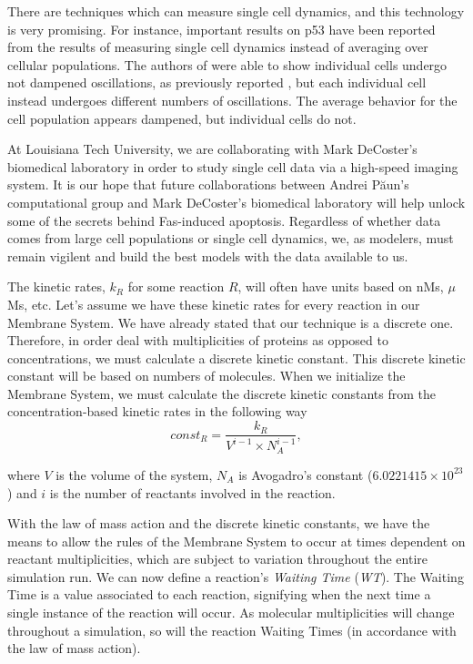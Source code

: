 \documentclass[copyright]{eptcs}
\newcommand{\noi}{\noindent}
\begin{document}
There are techniques which can measure single cell dynamics, and this technology is very promising.  For instance, important results on p53 have been reported~\cite{lahav04} from the results of measuring single cell dynamics instead of averaging over cellular populations.  The authors of \cite{lahav04} were able to show individual cells undergo not dampened oscillations, as previously reported \cite{baror00}, but each individual cell instead undergoes different numbers of oscillations.  The average behavior for the cell population appears dampened, but individual cells do not.

At Louisiana Tech University, we are collaborating with Mark DeCoster's biomedical laboratory in order to study single cell data via a high-speed imaging system.  It is our hope that future collaborations between Andrei P\u aun's computational group and Mark DeCoster's biomedical laboratory will help unlock some of the secrets behind Fas-induced apoptosis.  Regardless of whether data comes from large cell populations or single cell dynamics, we, as modelers, must remain vigilent and build the best models with the data available to us.

The kinetic rates, $k_R$ for some reaction $R$, will often have units based on nMs, $\mu $Ms, etc.  Let's assume we have these kinetic rates for every reaction in our Membrane System.  We have already stated that our technique is a discrete one.  Therefore, in order deal with multiplicities of proteins as opposed to concentrations, we must calculate a discrete kinetic constant.  This discrete kinetic constant will be based on numbers of molecules.  When we initialize the Membrane System, we must calculate the discrete kinetic constants from the concentration-based kinetic rates in the following way
\begin{equation}
\mathit{const}_R = \frac{k_R}{V^{i-1}\times N_A^{i-1}},
\label{constr}
\end{equation}

\noi where $V$ is the volume of the system, $N_A$ is Avogadro's constant ($6.0221415\times 10^{23}$) and $i$ is the number of reactants involved in the reaction.

With the law of mass action and the discrete kinetic constants, we have the means to allow the rules of the Membrane System to occur at times dependent on reactant multiplicities, which are subject to variation throughout the entire simulation run.  We can now define a reaction's \emph{Waiting Time} (\emph{WT}).  The Waiting Time is a value associated to each reaction, signifying when the next time a single instance of the reaction will occur.  As molecular multiplicities will change throughout a simulation, so will the reaction Waiting Times (in accordance with the law of mass action).
\end{document}
